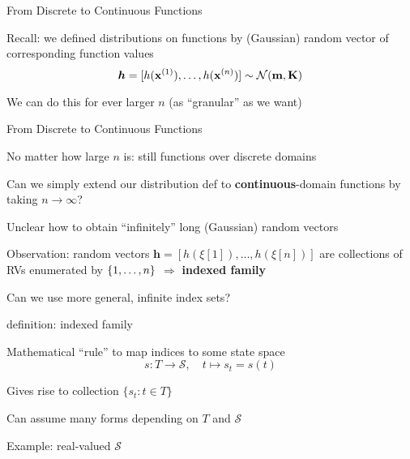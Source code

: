 \documentclass[11pt,compress,t,notes=noshow, xcolor=table]{beamer}
\begin{document}
\begin{framei}{From Discrete to Continuous Functions}
\item Recall: we defined distributions on functions by (Gaussian) random vector of corresponding function values 
$$\bm{h} = [h(\xi[1]), \dots, h(\xi[n])] \sim \gaussmk$$
\item We can do this for ever larger $n$ (as ``granular'' as we want)
\vfill
{}
\end{framei}

\begin{framei}[sep = L]{From Discrete to Continuous Functions}
\item No matter how large $n$ is: still functions over discrete domains
\item Can we simply extend our distribution def to \textbf{continuous}-domain functions by taking $n \rightarrow \infty$?
\item Unclear how to obtain ``infinitely'' long (Gaussian) random vectors
\item Observation: random vectors $\bm{h} = [h(\xi[1]), \dots, h(\xi[n])]$ are collections of RVs enumerated by $\nset$ $\Rightarrow$ \textbf{indexed family} 
\item Can we use more general, infinite index sets?
\end{framei}

\begin{framei}{definition: indexed family}
\item Mathematical ``rule'' to map indices to some state space %
$$s: T \rightarrow \mathcal{S}, \quad t \mapsto s_t = s(t) $$
\item Gives rise to collection $\{s_t: t \in T\}$
\item Can assume many forms depending on $T$ and $\mathcal{S}$
\item Example: real-valued $\mathcal{S}$ 
\end{framei}
\end{document}
